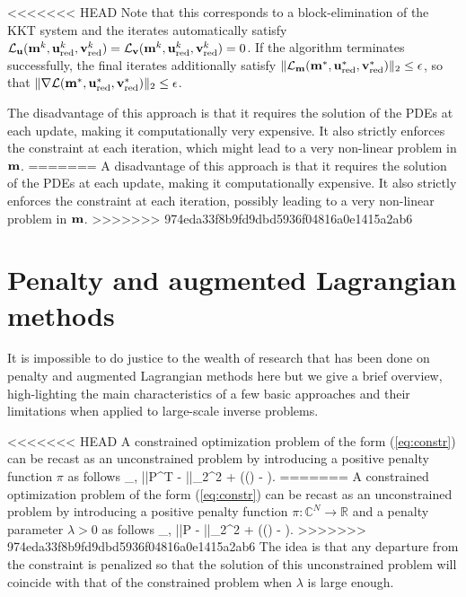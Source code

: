 \documentclass{iopart}
\begin{document}
{<<<<<<< HEAD
Note that this corresponds to a block-elimination of the KKT system and the iterates automatically satisfy $\mathcal{L}_{\mathbf{u}}(\mathbf{m}^k,\mathbf{u}^k_{\mathrm{red}},\mathbf{v}^k_{\mathrm{red}}) = \mathcal{L}_{\mathbf{v}}(\mathbf{m}^k,\mathbf{u}^k_{\mathrm{red}},\mathbf{v}^k_{\mathrm{red}}) = 0$. 
If the algorithm terminates successfully, the final iterates additionally satisfy
$\|\mathcal{L}_{\mathbf{m}}(\mathbf{m}^*,\mathbf{u}^*_{\mathrm{red}},\mathbf{v}^*_{\mathrm{red}})\|_2 \leq \epsilon$, so that 
$\|\nabla\mathcal{L}(\mathbf{m}^*,\mathbf{u}^*_{\mathrm{red}},\mathbf{v}^*_{\mathrm{red}})\|_2\leq \epsilon$.

The disadvantage of this approach is that it requires the solution of the PDEs at each update, making it computationally very expensive.  It also strictly enforces the constraint at each iteration, which might lead to a very non-linear problem in $\mathbf{m}$. 
=======
A disadvantage of this approach is that it requires the solution of the PDEs at each update, making it computationally expensive.  It also strictly enforces the constraint at each iteration, possibly leading to a very non-linear problem in $\mathbf{m}$. 
>>>>>>> 974eda33f8b9fd9dbd5936f04816a0e1415a2ab6

\section{Penalty and augmented Lagrangian methods}
\label{penalty}
It is impossible to do justice to the wealth of research that has been done on penalty and augmented Lagrangian methods here but we give a brief overview, high-lighting the main characteristics of a few basic approaches and their limitations when applied to large-scale inverse problems. 

<<<<<<< HEAD
A constrained optimization problem of the form (\ref{eq:constr}) can be recast as an unconstrained problem by introducing a positive penalty function $\pi$ as follows
\bq
\label{eq:penalty}
\min_{,} ||P^T - ||_2^2 + \lambda\pi(() - ).
=======
A constrained optimization problem of the form (\ref{eq:constr}) can be recast as an unconstrained problem by introducing a positive penalty function $\pi: \mathbb{C}^{N}\rightarrow\mathbb{R}$ and a penalty parameter $\lambda>0$ as follows
\bq
\label{eq:penalty}
\min_{,} ||P - ||_2^2 + \lambda\pi(() - ).
>>>>>>> 974eda33f8b9fd9dbd5936f04816a0e1415a2ab6
\eq
The idea is that any departure from the constraint is penalized so that the solution of this unconstrained problem will coincide with that of the constrained problem when $\lambda$ is large enough.

}
\end{document}
